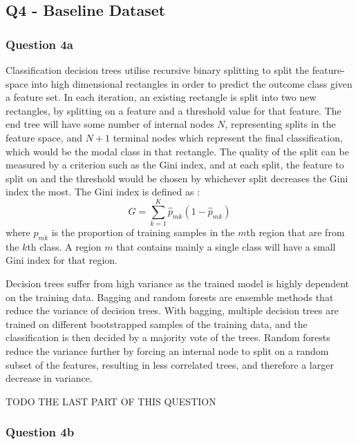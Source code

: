 
\subsection{Q4 - Baseline Dataset}\label{subsec:q4}
\subsubsection{Question 4a}\label{subsubsec:q4a}
    Classification decision trees utilise recursive binary splitting to split the feature-space into high dimensional
    rectangles in order to predict the outcome class given a feature set.
    In each iteration, an existing rectangle is split into two new rectangles, by splitting on a feature and a threshold
    value for that feature.
    The end tree will have some number of internal nodes $N$, representing splits in the feature space, and $N + 1$
    terminal nodes which represent the final classification, which would be the modal class in that rectangle.
    The quality of the split can be measured by a criterion such as the Gini index, and at each split, the feature to
    split on and the threshold would be chosen by whichever split decreases the Gini index the most.
    The Gini index is defined as \cite{ISL}:
    \begin{equation}
        G = \sum_{k=1}^{K} \hat{p}_{mk}(1 - \hat{p}_{mk})
        \label{eq:gini-index}
    \end{equation}
    where $\hat{p}_{mk}$ is the proportion of training samples in the $m$th region that are from the $k$th class.
    A region $m$ that contains mainly a single class will have a small Gini index for that region.

    Decision trees suffer from high variance as the trained model is highly dependent on the training data.
    Bagging and random forests are ensemble methods that reduce the variance of decision trees.
    With bagging, multiple decision trees are trained on different bootstrapped samples of the training data, and the
    classification is then decided by a majority vote of the trees.
    Random forests reduce the variance further by forcing an internal node to split on a random subset of the features,
    resulting in less correlated trees, and therefore a larger decrease in variance.

    TODO THE LAST PART OF THIS QUESTION

\subsubsection{Question 4b}\label{subsubsec:q4b}
